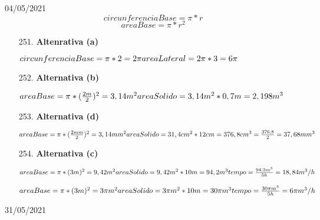 \documentclass{SchoolBook}
\begin{document}
    \begin{day}{04/05/2021}
        $$ circunferenciaBase = \pi * r $$
        $$ areaBase = \pi * r^2 $$
    
        \begin{enumerate}
            \item[251.] \textbf{Altenrativa (a)}
            
            \begin{math}
                circunferenciaBase = \pi * 2 = 2\pi \\
                areaLateral = 2\pi * 3 = 6\pi
            \end{math}
            
            \item[252.] \textbf{Alternativa (b)}
            
            \begin{math}
                areaBase = \pi * (\frac{2m}{2})^2 = 3,14 m^2 \\
                areaSolido = 3,14 m^2 * 0,7 m = 2,198 m^3
            \end{math}
            
            \item[253.] \textbf{Alternativa (d)}
            
            \begin{math}
                areaBase = \pi * (\frac{2mm}{2})^2 = 3,14 mm^2 \\
                areaSolido = 31,4 cm^2 * 12cm = 376,8 cm^3 = \frac{376,8}{2} = 37,68 mm^3
            \end{math}
            
            \item[254.] \textbf{Alternativa (c)}
            
            \begin{math}
                areaBase = \pi * (3m)^2 = 9,42 m^2 \\
                areaSolido = 9,42 m^2 * 10m = 94,2 m^3 \\
                tempo = \frac{94,2 m^3}{5 h} = 18,84 m^3 / h
            \end{math}
            
            \begin{math}
                areaBase = \pi * (3m)^2 = 3\pi m^2 \\
                areaSolido = 3\pi m^2 * 10m = 30\pi m^3 \\
                tempo = \frac{30\pi m^3}{5 h} = 6 \pi m^3 / h
            \end{math}
            
        \end{enumerate}
    \end{day}
    
    \begin{day}{31/05/2021}
        
    \end{day}
\end{document}

